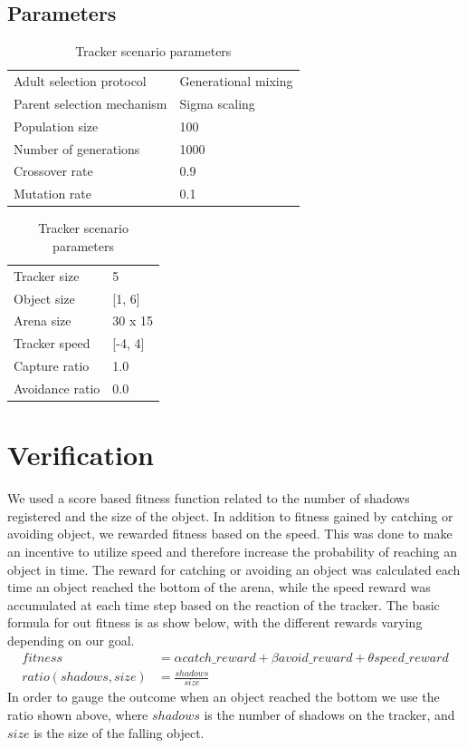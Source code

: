 \documentclass[12pt]{article}
\begin{document}
	\subsection{Parameters}
		\begin{table}[H]
			\parbox{.45\linewidth}{
				\centering
				\begin{tabular}{ll}
					Adult selection protocol & Generational mixing\\
					Parent selection mechanism & Sigma scaling\\
					Population size & 100\\
					Number of generations & 1000\\
					Crossover rate & 0.9\\
					Mutation rate & 0.1
				\end{tabular}
				\caption{Evolution algorithm parameters}
			}
			\hfill
			\parbox{.45\linewidth}{
				\centering
				\begin{tabular}{ll}
					Tracker size & 5\\
					Object size & [1, 6]\\
					Arena size & 30 x 15\\
					Tracker speed & [-4, 4]\\
					Capture ratio & 1.0\\
					Avoidance ratio & 0.0
				\end{tabular}
				\caption{Tracker scenario parameters}
			}
		\end{table}
\section{Verification}
	We used a score based fitness function related to the number of shadows registered and the size of the object. In addition to fitness gained by catching or avoiding object, we rewarded fitness based on the speed. This was done to make an incentive to utilize speed and therefore increase the probability of reaching an object in time. The reward for catching or avoiding an object was calculated each time an object reached the bottom of the arena, while the speed reward was accumulated at each time step based on the reaction of the tracker. The basic formula for out fitness is as show below, with the different rewards varying depending on our goal.
	\begin{align}
		fitness &= \alpha catch\_reward+\beta avoid\_reward+\theta speed\_reward\nonumber\\
		ratio(shadows, size) &= \frac{shadows}{size}\nonumber
	\end{align}
In order to gauge the outcome when an object reached the bottom we use the ratio shown above, where $shadows$ is the number of shadows on the tracker, and $size$ is the size of the falling object.
\end{document}

